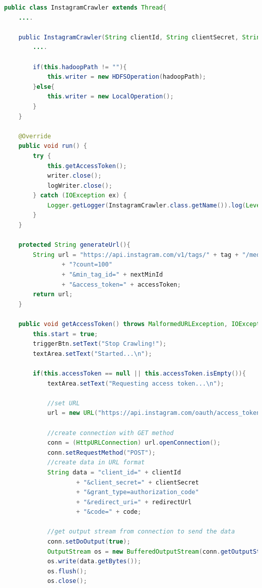 \begin{lstlisting}[language=Java,basicstyle=\tiny,caption=TwitterStreamer.java,label={lst:kode_instagram_crawler}]
public class InstagramCrawler extends Thread{
    ....
    
    public InstagramCrawler(String clientId, String clientSecret, String redirectUrl, String code, String nextMinId, String tag, String hadoopPath, String filePath, JTextArea textArea, JLabel lastStreamLabel, JTextField minTagIdTextField, JTextArea jsonTextArea, JButton triggerBtn, InstagramForm form) {
        ....
        
        if(this.hadoopPath != ""){
            this.writer = new HDFSOperation(hadoopPath);
        }else{
            this.writer = new LocalOperation();
        }
    }
    
    @Override
    public void run() {
        try {
            this.getAccessToken();
            writer.close();
            logWriter.close();
        } catch (IOException ex) {
            Logger.getLogger(InstagramCrawler.class.getName()).log(Level.SEVERE, null, ex);
        }
    }
    
    protected String generateUrl(){
        String url = "https://api.instagram.com/v1/tags/" + tag + "/media/recent"
                + "?count=100"
                + "&min_tag_id=" + nextMinId
                + "&access_token=" + accessToken;
        return url;
    }
    
    public void getAccessToken() throws MalformedURLException, IOException{
        this.start = true;
        triggerBtn.setText("Stop Crawling!");
        textArea.setText("Started...\n");
        
        if(this.accessToken == null || this.accessToken.isEmpty()){
            textArea.setText("Requesting access token...\n");

            //set URL
            url = new URL("https://api.instagram.com/oauth/access_token");

            //create connection with GET method
            conn = (HttpURLConnection) url.openConnection();
            conn.setRequestMethod("POST");
            //create data in URL format
            String data = "client_id=" + clientId
                    + "&client_secret=" + clientSecret
                    + "&grant_type=authorization_code"
                    + "&redirect_uri=" + redirectUrl
                    + "&code=" + code;

            //get output stream from connection to send the data
            conn.setDoOutput(true);
            OutputStream os = new BufferedOutputStream(conn.getOutputStream());
            os.write(data.getBytes());
            os.flush();
            os.close();


\end{lstlisting}
